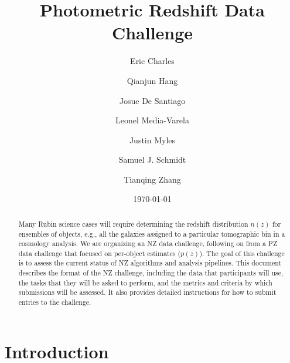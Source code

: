 \documentclass[11pt,twoside,letterpaper,onecolumn,english]{article}
\begin{document}

\title{Photometric Redshift Data Challenge}
\author[1,2]{Eric Charles}
\author[3]{Qianjun Hang}
\author[4]{Josue De Santiago}
\author[5]{Leonel Media-Varela}
\author[6]{Justin Myles}
\author[7]{Samuel J.  Schmidt}
\author[1,2]{Tianqing Zhang}
\date{\today}

\maketitle

\begin{abstract}
  Many Rubin science cases will require determining the 
  redshift distribution $n(z)$ for ensembles of objects, e.g., all the
  galaxies assigned to a particular tomographic bin in a cosmology analysis.
  We are organizing an NZ data challenge, following
  on from a PZ data challenge that focused on per-object estimates ($p(z)$). 
  The goal of this challenge is to assess the current status of NZ algorithms and analysis pipelines.
  This document describes the format of the NZ challenge, including the
  data that participants will use, the tasks that they will
  be asked to perform, and the metrics and criteria by which submissions will
  be assessed. It also provides detailed instructions for how to
  submit entries to the challenge.  
\end{abstract}


\section{Introduction}
\label{sec:intro}
\end{document}
